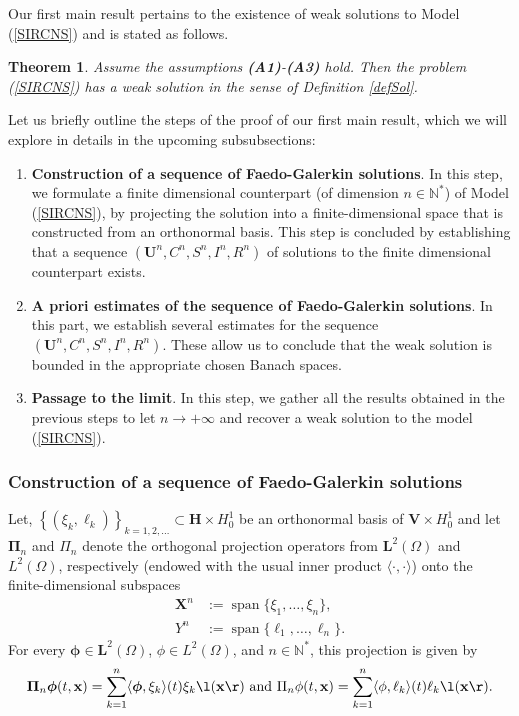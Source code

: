 \documentclass[10pt,number,preprint,times]{elsarticle}
\numberwithin{equation}{section} %
\newtheorem{thm}{Theorem}[section]
\begin{document}
	Our first main result pertains to the existence of weak solutions to Model (\ref{SIRCNS}) and is stated as follows.
	\begin{thm}\label{theo-existence}
		Assume the assumptions {\bf(A1)}-{\bf(A3)}  hold. 
		Then the problem (\ref{SIRCNS}) has a weak solution in the sense of Definition \ref{defSol}.
	\end{thm}
	Let us briefly outline the steps of the proof of our first main result, which we will explore in details in the upcoming subsubsections:
	\begin{enumerate}
		\item \textbf{Construction of a sequence of Faedo-Galerkin solutions}. 
		In this step, we formulate a finite dimensional counterpart (of dimension $n \in \mathbb{N}^*$)  of Model (\ref{SIRCNS}), by projecting the solution into a finite-dimensional space that is constructed from an orthonormal basis. This step is concluded by establishing that  a sequence $(\boldsymbol{U}^n,C^n,S^n,I^n,R^n)$ of solutions to the finite dimensional counterpart exists.
		\item \textbf{A priori estimates of the sequence of Faedo-Galerkin solutions}.  In this part, we  establish several estimates for the sequence $(\boldsymbol{U}^n,C^n,S^n,I^n,R^n)$. These allow us to conclude that the weak solution is bounded in the appropriate chosen Banach spaces.
		\item \textbf{Passage to the limit}. In this step, we gather all the results obtained in the previous steps to let $n\rightarrow +\infty$ and recover a weak solution to the model (\ref{SIRCNS}). 
	\end{enumerate}
	
	\subsubsection{Construction of a sequence of Faedo-Galerkin solutions}
	Let, $\left\{ (\xi_k, \ell_k) \right\}_{k=1,2, \ldots} \subset \boldsymbol{H} \times H^1_0$ be an orthonormal basis of $\boldsymbol{V} \times H_0^1$ and let $\boldsymbol{\Pi}_n$ and  $\Pi_n$ denote the orthogonal projection operators from $\boldsymbol{L}^2(\Omega)$ and $L^2(\Omega)$, respectively
	(endowed with the usual inner product $\langle \cdot , \cdot \rangle$) onto the finite-dimensional subspaces
	\[
	\begin{aligned}
		\boldsymbol{X}^{n}  &:= \operatorname{span}\{\xi_1, \dots, \xi_n\},\\
		Y^n &:= \operatorname{span}\{\ell_1, \dots, \ell_n\}.
	\end{aligned}
	\]
	For every $\boldsymbol{\phi} \in \boldsymbol{L}^2(\Omega)$,  $\phi \in L^2(\Omega)$, and $n \in \mathbb{N}^*$, this projection is given by
	\[
	\boldsymbol{\Pi}_n \boldsymbol{\phi} (t,\mathbf{x}) = \sum_{k=1}^n \langle  \boldsymbol{\phi} , \xi_k \rangle(t) \xi_k\l(\mathbf{x}\r) \text{ and } \Pi_n \phi (t,\mathbf{x}) = \sum_{k=1}^n \langle \phi , \ell_k \rangle(t) \ell_k\l(\mathbf{x}\r).
	\]
	
\end{document}
